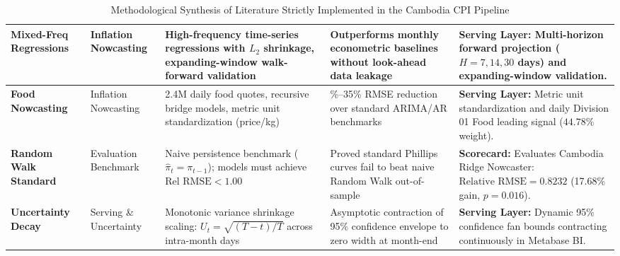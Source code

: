 \begin{table}[H]
\begin{tabularx}{\textwidth}{|>{\raggedright\arraybackslash}p{2.1cm}|>{\centering\arraybackslash}p{1.6cm}|>{\raggedright\arraybackslash}X|>{\raggedright\arraybackslash}p{2.6cm}|>{\raggedright\arraybackslash}X|}
\textbf{Mixed-Freq Regressions} \citep{babii2022machine} & Inflation Nowcasting & High-frequency time-series regressions with $L_2$ shrinkage, expanding-window walk-forward validation & Outperforms monthly econometric baselines without look-ahead data leakage & \textbf{Serving Layer:} Multi-horizon forward projection ($H = 7, 14, 30$ days) and expanding-window validation. \\ \hline
\textbf{Food Nowcasting} \citep{macias2023nowcasting} & Inflation Nowcasting & 2.4M daily food quotes, recursive bridge models, metric unit standardization (price/kg) & 15\%--35\% RMSE reduction over standard ARIMA/AR benchmarks & \textbf{Serving Layer:} Metric unit standardization and daily Division 01 Food leading signal ($44.78\%$ weight). \\ \hline
\textbf{Random Walk Standard} \citep{atkeson2001phillips} & Evaluation Benchmark & Naive persistence benchmark ($\widehat{\pi}_t = \pi_{t-1}$); models must achieve $\text{Rel RMSE} < 1.00$ & Proved standard Phillips curves fail to beat naive Random Walk out-of-sample & \textbf{Scorecard:} Evaluates Cambodia Ridge Nowcaster: $\text{Relative RMSE} = 0.8232$ (17.68\% gain, $p=0.016$). \\ \hline
\textbf{Uncertainty Decay} \citep{bates1969combination, bis2024spectrum} & Serving \& Uncertainty & Monotonic variance shrinkage scaling: $U_t = \sqrt{(T-t)/T}$ across intra-month days & Asymptotic contraction of 95\% confidence envelope to zero width at month-end & \textbf{Serving Layer:} Dynamic 95\% confidence fan bounds contracting continuously in Metabase BI. \\ \hline
\end{tabularx}
\caption{Methodological Synthesis of Literature Strictly Implemented in the Cambodia CPI Pipeline}
\label{tab:literature_matrix}
\end{table}


